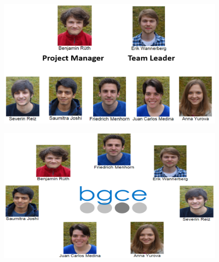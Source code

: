 \begin{frame}
\begin{figure}
		\includegraphics[width=0.9\linewidth]{Pictures/FirstHalf/Team_1.png}
		\end{figure}

\end{frame}

\begin{frame}
\begin{figure}
	\includegraphics[width=0.85\linewidth]{Pictures/FirstHalf/Team_2.png}
		\end{figure}

\end{frame}